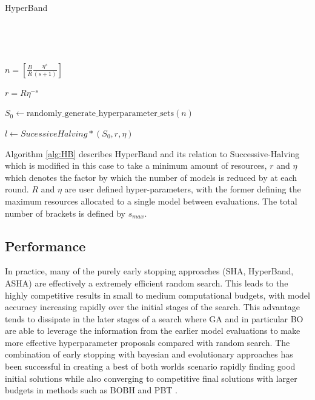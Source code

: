 \documentclass{article}
\begin{document}
		\begin{algorithm}[H]\label{alg:HB}
			\caption{HyperBand}

			\SetAlgoLined
			\
			
			\



				{
				\(n = \left[ \frac{B}{R}\frac{\eta^s}{(s+1)} \right]\)\;

				\(r = R\eta^{-s}\)\;

				\(S_0 \leftarrow \text{randomly\_generate\_hyperparameter\_sets}(n)\)\;

				\(l \leftarrow SucessiveHalving*(S_0,r,\eta)\)\;

				}

		\end{algorithm}

		Algorithm \ref{alg:HB} describes HyperBand and its relation to Successive-Halving which is modified in this case to take a minimum amount of resources, \(r\) and \(\eta\) which denotes the factor by which the number of models is reduced by at each round. \(R\) and \(\eta\) are user defined hyper-parameters, with the former defining the maximum resources allocated to a single model between evaluations. The total number of brackets is defined by \(s_{max}\). 


\subsection{Performance}
In practice, many of the purely early stopping approaches (SHA, HyperBand, ASHA) are effectively a extremely efficient random search. This leads to the highly competitive results in small to medium computational budgets, with model accuracy increasing rapidly over the initial stages of the search. This advantage tends to dissipate in the later stages of a search where GA and in particular BO are able to leverage the information from the earlier model evaluations to make more effective hyperparameter proposals compared with random search. The combination of early stopping with bayesian and evolutionary approaches has been successful in creating a best of both worlds scenario rapidly finding good initial solutions while also converging to competitive final solutions with larger budgets in methods such as BOBH and PBT \cite{32} \cite{34} \cite{39}.
\end{document}
